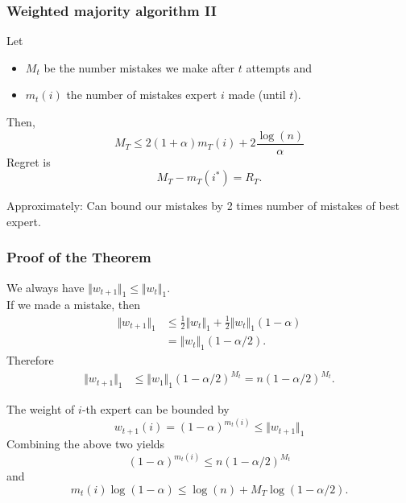 \documentclass{beamer}
\begin{document}
\begin{frame}
  \frametitle{Weighted majority algorithm II}
    Let
    \begin{itemize}
      \item $M_t$ be the number mistakes we make after $t$ attempts and
      \item $m_t(i)$ the number of mistakes expert $i$ made (until $t$).
    \end{itemize}

  \begin{theorem}
    Then,
    \begin{equation}
      M_T \le 2(1+\alpha) m_T(i) + 2 \frac{\log(n)}{\alpha}
    \end{equation}
    Regret is
    \begin{equation}
      M_T -m_T(i^*) = R_T.
    \end{equation}
  \end{theorem}

  Approximately: Can bound our mistakes by 2 times number of mistakes of best expert.
\end{frame}

\begin{frame}
  \frametitle{Proof of the Theorem}
  We always have $ \Vert w_{t+1} \Vert_1 \le \Vert w_t \Vert_1$. \\
  If we made a mistake, then
  \begin{equation}
    \begin{aligned}
      \Vert w_{t+1} \Vert_1 &\le \frac12 \Vert w_t \Vert_1 + \frac12 \Vert w_t \Vert_1 (1-\alpha) \\
      &= \Vert w_t \Vert_1 (1-\alpha/2).
    \end{aligned}
  \end{equation}
  Therefore
  \begin{align}
      \Vert w_{t+1} \Vert_1 &\le \Vert w_1 \Vert_1 (1-\alpha/2)^{M_t} = n (1-\alpha/2)^{M_t}.
  \end{align}

  The weight of $i$-th expert can be bounded by
  \begin{equation}
    w_{t+1}(i) = (1-\alpha)^{m_t(i)} \le \Vert w_{t+1} \Vert_1
  \end{equation}
  Combining the above two yields
  \begin{equation}
    {(1-\alpha)}^{m_t(i)} \le n (1-\alpha/2)^{M_t}
  \end{equation}
  and
  \begin{equation}
    m_t(i) \log(1-\alpha) \le \log(n) + M_T \log(1-\alpha/2).
  \end{equation}
\end{frame}
\end{document}
